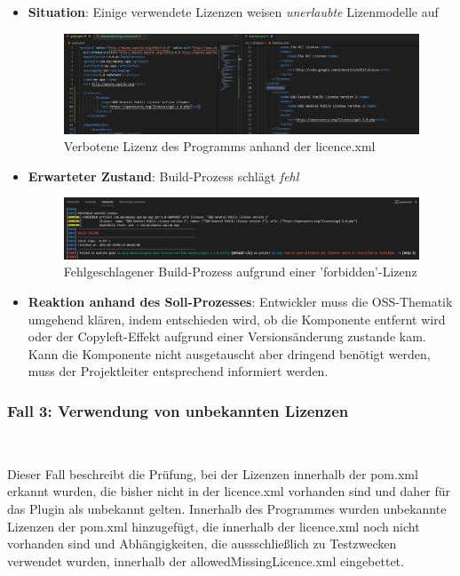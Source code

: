\begin{itemize}
    \item \textbf{Situation}: Einige verwendete Lizenzen weisen \textit{unerlaubte} Lizenmodelle auf
    
    \begin{figure}[h]
        \centering
        \includegraphics[scale=0.4]{Bilder/Fall2Situation.png}
        \caption{Verbotene Lizenz des Programms anhand der licence.xml}
    \end{figure}

    \newpage
    \item \textbf{Erwarteter Zustand}: Build-Prozess schlägt \textit{fehl} 
    
    \begin{figure}[h]
        \centering
        \includegraphics[scale=0.4]{Bilder/Fall2Zustand.png}
        \caption{Fehlgeschlagener Build-Prozess aufgrund einer 'forbidden'-Lizenz}
    \end{figure}

    \item \textbf{Reaktion anhand des Soll-Prozesses}: Entwickler muss die OSS-Thematik umgehend klären, indem entschieden wird, ob die Komponente entfernt wird oder der Copyleft-Effekt aufgrund einer Versionsänderung zustande kam. Kann die Komponente nicht ausgetauscht aber dringend benötigt werden, muss der Projektleiter entsprechend informiert werden.  
\end{itemize}

\subsubsection{Fall 3: Verwendung von unbekannten Lizenzen} $~$

Dieser Fall beschreibt die Prüfung, bei der Lizenzen innerhalb der pom.xml erkannt wurden, die bisher nicht in der licence.xml vorhanden sind und daher für das Plugin als unbekannt gelten. Innerhalb des Programmes wurden unbekannte Lizenzen der pom.xml hinzugefügt, die innerhalb der licence.xml noch nicht vorhanden sind und Abhängigkeiten, die aussschließlich zu Testzwecken verwendet wurden, innerhalb der allowedMissingLicence.xml eingebettet. 

